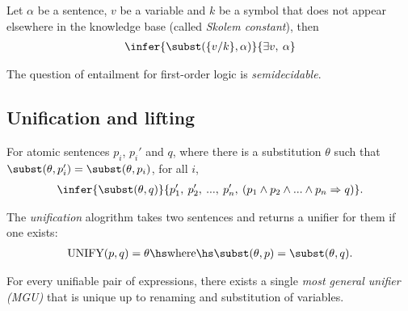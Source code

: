 \documentclass{article}
\begin{document}
\begin{theorem}
    Let $\alpha$ be a sentence, $v$ be a variable and $k$ be a
    symbol that does not appear elsewhere in the knowledge base
    (called \emph{Skolem constant}), then 
    \begin{align*}
        \infer{\subst(\{v/k\},\alpha)}{\exists v,\:\alpha}
    \end{align*} 
\end{theorem}

\begin{theorem}
    The question of entailment for first-order logic is \emph{semidecidable}.
\end{theorem} 

\subsection{Unification and lifting}

\begin{theorem}
    For atomic sentences $p_i$, $p_i'$ and $q$, where there is a substitution
    $\theta$ such that $\subst(\theta,p_i')=\subst(\theta,p_i)$, for
    all $i$,
    \begin{align*}
        \infer{\subst(\theta,q)}{p_1',\: p_2',\: ...,\: p_n',\:(p_1\wedge p_2 \wedge ... \wedge p_n\Rightarrow q)}.
    \end{align*}
\end{theorem}

\begin{definition}
    The \emph{unification} alogrithm takes two sentences and returns a unifier
    for them if one exists:
    \begin{align*}
        \text{UNIFY}(p,q)=\theta \hs\text{where}\hs \subst(\theta,p)=\subst(\theta,q).
    \end{align*}
\end{definition}

\begin{theorem}
    For every unifiable pair of expressions, there exists a single \emph{most general
    unifier (MGU)} that is unique up to renaming and substitution of variables.
\end{theorem}
\end{document}
